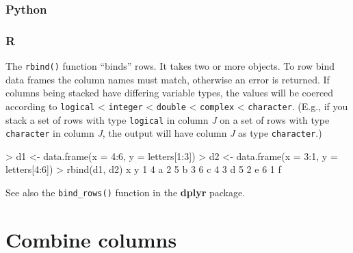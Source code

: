 \documentclass[
]{book}
\newenvironment{Shaded}{\begin{snugshade}}{\end{snugshade}}
\newcommand{\AttributeTok}[1]{\textcolor[rgb]{0.77,0.63,0.00}{#1}}
\newcommand{\DecValTok}[1]{\textcolor[rgb]{0.00,0.00,0.81}{#1}}
\newcommand{\FunctionTok}[1]{\textcolor[rgb]{0.00,0.00,0.00}{#1}}
\newcommand{\NormalTok}[1]{#1}
\newcommand{\OtherTok}[1]{\textcolor[rgb]{0.56,0.35,0.01}{#1}}
\newcommand{\SpecialCharTok}[1]{\textcolor[rgb]{0.00,0.00,0.00}{#1}}
\begin{document}
\hypertarget{python-23}{%
\subsubsection*{Python}\label{python-23}}

\hypertarget{r-23}{%
\subsubsection*{R}\label{r-23}}

The \texttt{rbind()} function ``binds'' rows. It takes two or more objects. To row bind data frames the column names must match, otherwise an error is returned. If columns being stacked have differing variable types, the values will be coerced according to \texttt{logical} \textless{} \texttt{integer} \textless{} \texttt{double} \textless{} \texttt{complex} \textless{} \texttt{character}. (E.g., if you stack a set of rows with type \texttt{logical} in column \emph{J} on a set of rows with type \texttt{character} in column \emph{J}, the output will have column \emph{J} as type \texttt{character}.)

\begin{Shaded}
\begin{Highlighting}[]
\SpecialCharTok{\textgreater{}}\NormalTok{ d1 }\OtherTok{\textless{}{-}} \FunctionTok{data.frame}\NormalTok{(}\AttributeTok{x =} \DecValTok{4}\SpecialCharTok{:}\DecValTok{6}\NormalTok{, }\AttributeTok{y =}\NormalTok{ letters[}\DecValTok{1}\SpecialCharTok{:}\DecValTok{3}\NormalTok{])}
\SpecialCharTok{\textgreater{}}\NormalTok{ d2 }\OtherTok{\textless{}{-}} \FunctionTok{data.frame}\NormalTok{(}\AttributeTok{x =} \DecValTok{3}\SpecialCharTok{:}\DecValTok{1}\NormalTok{, }\AttributeTok{y =}\NormalTok{ letters[}\DecValTok{4}\SpecialCharTok{:}\DecValTok{6}\NormalTok{])}
\SpecialCharTok{\textgreater{}} \FunctionTok{rbind}\NormalTok{(d1, d2)}
\NormalTok{  x y}
\DecValTok{1} \DecValTok{4}\NormalTok{ a}
\DecValTok{2} \DecValTok{5}\NormalTok{ b}
\DecValTok{3} \DecValTok{6}\NormalTok{ c}
\DecValTok{4} \DecValTok{3}\NormalTok{ d}
\DecValTok{5} \DecValTok{2}\NormalTok{ e}
\DecValTok{6} \DecValTok{1}\NormalTok{ f}
\end{Highlighting}
\end{Shaded}

See also the \texttt{bind\_rows()} function in the \textbf{dplyr} package.

\hypertarget{combine-columns}{%
\section{Combine columns}\label{combine-columns}}
\end{document}
